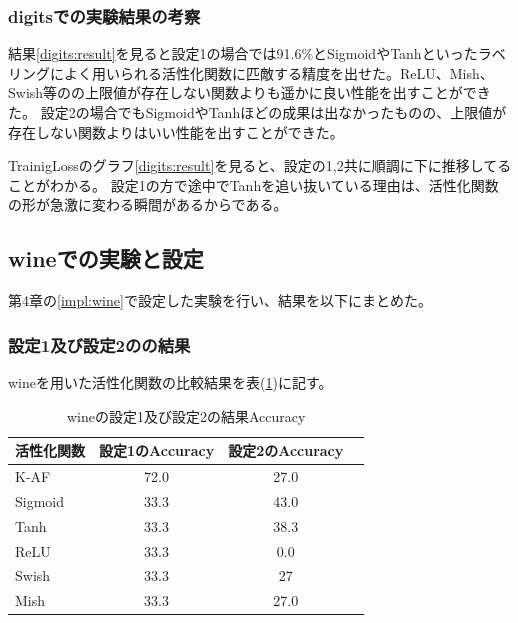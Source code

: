 \subsubsection{digitsでの実験結果の考察}
結果\ref{digits:result}を見ると設定1の場合では91.6\%とSigmoidやTanhといったラベリングによく用いられる活性化関数に匹敵する精度を出せた。ReLU、Mish、Swish等のの上限値が存在しない関数よりも遥かに良い性能を出すことができた。
設定2の場合でもSigmoidやTanhほどの成果は出なかったものの、上限値が存在しない関数よりはいい性能を出すことができた。

TrainigLossのグラフ\ref{digits:result}を見ると、設定の1,2共に順調に下に推移してることがわかる。
設定1の方で途中でTanhを追い抜いている理由は、活性化関数の形が急激に変わる瞬間があるからである。


\subsection{wineでの実験と設定}
\label{ev:wineでの実験と設定}

第4章の\ref{impl:wine}で設定した実験を行い、結果を以下にまとめた。
\subsubsection{設定1及び設定2のの結果}

wineを用いた活性化関数の比較結果を表(\ref{result:winetable})に記す。


\begin{table}[htbp]
    \begin{center}
        \caption{wineの設定1及び設定2の結果Accuracy}
        \label{result:winetable}
        \vspace{2mm} 
        \begin{tabular}{l*{2}{c}r}
            活性化関数              & 設定1のAccuracy &  設定2のAccuracy \\
            \hline
            K-AF            & 72.0 & 27.0 \\
            Sigmoid            & 33.3 & 43.0\\
            Tanh            & 33.3 & 38.3\\
            ReLU        & 33.3 & 0.0\\
            Swish           & 33.3 & 27 \\
            Mish           & 33.3 &  27.0\\
    
        \end{tabular}
    \end{center}
\end{table}


